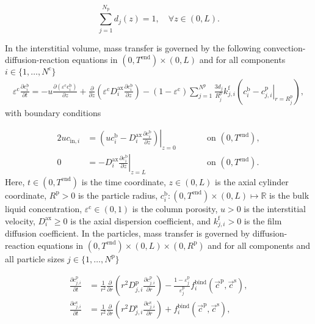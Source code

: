 \documentclass{article}
\begin{document}
    \begin{equation*}
	    \sum_{j=1}^{N_{\mathrm{p}}} d_j(z) = 1 , \quad \forall z \in (0, L).
    \end{equation*}

    
In the interstitial volume, mass transfer is governed by the following convection-diffusion-reaction equations in $(0, T^\mathrm{end})\times (0, L)$ and for all components $i\in\{1, \dots, N^{\mathrm{c}} \}$
\begin{align}
\varepsilon^{\mathrm{c}} \frac{\partial c^{\mathrm{b}}_i}{\partial t} = - u \frac{\partial \left( \varepsilon^{\mathrm{c}} c^{\mathrm{b}}_i \right)}{\partial z} + \frac{\partial}{\partial z} \left( \varepsilon^{\mathrm{c}} D^{\mathrm{ax}}_{i} \frac{\partial c^{\mathrm{b}}_i}{\partial z} \right)- \left(1 - \varepsilon^{\mathrm{c}} \right) \sum_{j=1}^{N^{\mathrm{p}}} \frac{3d_j}{R^{\mathrm{p}}_{j}} k^{\mathrm{f}}_{j,i} \left(c^{\mathrm{b}}_i - \left. c^{\mathrm{p}}_{j,i} \right|_{r = R^{\mathrm{p}}_{j}} \right),
\end{align}
with boundary conditions

\begin{alignat}{2}
u c_{\mathrm{in},i} &= \left.\left( u c^{\mathrm{b}}_i - D^{\mathrm{ax}}_{i} \frac{\partial c^{\mathrm{b}}_i}{\partial z}\right)\right|_{z=0} & &\qquad\text{on }(0, T^{\mathrm{end}}),\\
               0 &= - D^{\mathrm{ax}}_{i} \left. \frac{\partial c^{\mathrm{b}}_i}{\partial z} \right|_{z=L} & &\qquad\text{on }(0, T^{\mathrm{end}}).
\end{alignat}
Here, $t\in (0, T^{\mathrm{end}})$ is the time coordinate, $z\in (0, L)$ is the axial cylinder coordinate, $R^\mathrm{p}> 0$ is the particle radius, $c^{\mathrm{b}}_i\colon (0, T^\mathrm{end})\times (0, L) \mapsto \mathbb{R}$ is the bulk liquid concentration, $\varepsilon^{\mathrm{c}}\in (0, 1)$ is the column porosity, $u> 0$ is the interstitial velocity, $D^\mathrm{ax}_i\geq 0$ is the axial dispersion coefficient, and $k^\mathrm{f}_{j,i}> 0$ is the film diffusion coefficient.
In the particles, mass transfer is governed by diffusion-reaction equations in $ (0, T^\mathrm{end}) \times (0, L)\times (0, R^{\mathrm{p}})$ and for all components and all particle sizes $j\in\{1, \dots, N^{\mathrm{p}}\}$

\begin{align}
\frac{\partial c^{\mathrm{p}}_{j,i}}{\partial t} &= \frac{1}{r^2} \frac{\partial }{\partial r} \left( r^2 D_{j,i}^{\mathrm{p}} \frac{\partial c^{\mathrm{p}}_{j,i}}{\partial r} \right) - \frac{1 - \varepsilon^{\mathrm{p}}_{j}}{\varepsilon^{\mathrm{p}}_{j}}f^{\mathrm{bind}}_{i}\left( \vec{c}^{\mathrm{p}}, \vec{c}^{\mathrm{s}} \right) , \\
\frac{\partial c^{\mathrm{s}}_{j,i}}{\partial t} &=  \frac{1}{r^2} \frac{\partial }{\partial r} \left( r^2 D_{j,i}^{\mathrm{s}} \frac{\partial c^{\mathrm{s}}_{j,i}}{\partial r} \right)  + f^{\mathrm{bind}}_{i}\left( \vec{c}^{\mathrm{p}}, \vec{c}^{\mathrm{s}} \right) ,
\end{align}
\end{document}
